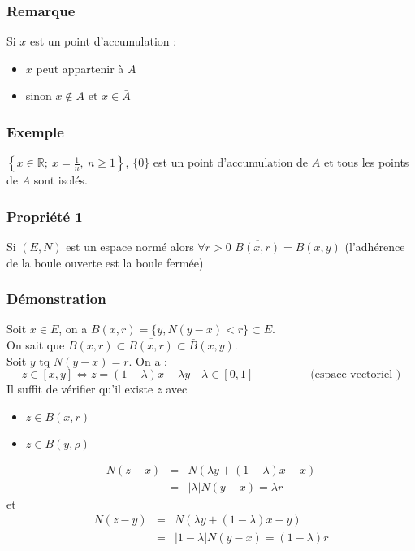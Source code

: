 \documentclass[a4paper, oneside]{report}
\newcommand{\R}{\mathbb{R}}
\newcommand{\ev}{espace vectoriel }
\newcommand{\fracun}[1]{\frac{1}{#1}}
\begin{document}
\subsubsection{Remarque}
Si $x$ est un point d'accumulation :
\begin{itemize}
\item $x$ peut appartenir à $A$
\item sinon $x\notin A$ et $x\in \bar{A}$
\end{itemize}

\subsubsection{Exemple}

$\left\{x\in \R;~x=\fracun{n},~ n \geq 1 \right\}$, $\{0\}$ est un point d'accumulation de $A$ et tous les points de $A$ sont isolés.

\subsubsection{Propriété 1}

Si $(E,N)$ est un espace normé alors $\forall r>0$ $\overline{B(x,r)}=\bar{B}(x,y)$ (l'adhérence de la boule ouverte est la boule fermée)

\subsubsection{Démonstration}

Soit $x\in E$, on a $B(x,r) = \{y, N(y-x) <r \} \subset E$.\\
On sait que $B(x,r)\subset \overline{B(x,r)}\subset \bar{B}(x,y)$.\\
Soit $y$ tq $N(y-x)=r$.
On a :
$$z\in [x,y] \Leftrightarrow z=(1-\lambda)x+\lambda y\hspace{1em}\lambda \in [0,1]\hspace{5em} \text{(\ev)}$$
Il suffit de vérifier qu'il existe $z$ avec 
\begin{itemize}
\item $z\in B(x,r)$
\item $z\in B(y,\rho)$

\end{itemize}

$$\begin{array}{lll}
N(z-x)&=& N(\lambda y + (1-\lambda)x -x)\\
&=&|\lambda| N(y-x)= \lambda r
\end{array}$$
et
$$\begin{array}{lll}
N(z-y)&=& N(\lambda y + (1-\lambda)x -y)\\
&=&|1- \lambda| N(y-x)= (1-\lambda) r
\end{array}$$
\end{document}
